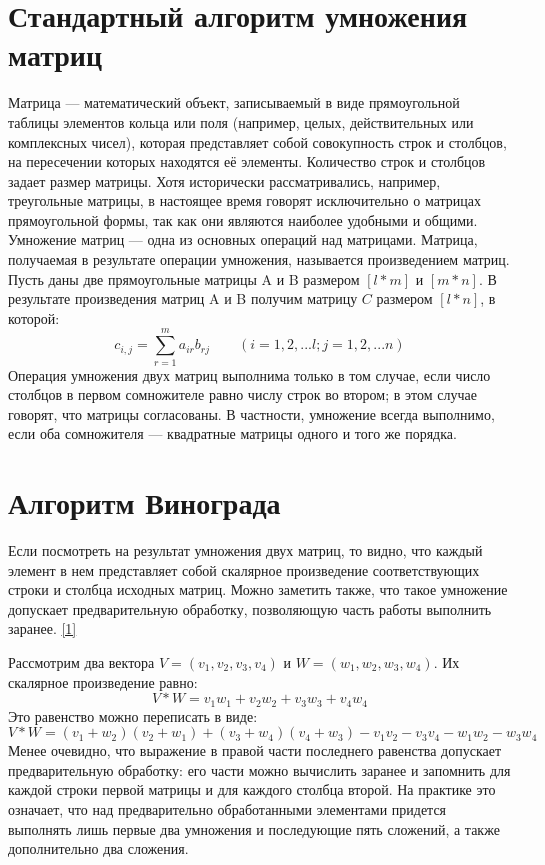 \documentclass[12pt]{report}
\begin{document}
	\section{Стандартный алгоритм умножения матриц}
	Матрица — математический объект, записываемый в виде прямоугольной таблицы элементов кольца или поля (например, целых, действительных или комплексных чисел), которая представляет собой совокупность строк и столбцов, на пересечении которых находятся её элементы. Количество строк и столбцов задает размер матрицы. Хотя исторически рассматривались, например, треугольные матрицы, в настоящее время говорят исключительно о матрицах прямоугольной формы, так как они являются наиболее удобными и общими. 
	Умножение матриц — одна из основных операций над матрицами. Матрица, получаемая в результате операции умножения, называется произведением матриц.
	Пусть даны две прямоугольные матрицы A и B размером $[l * m]$ и $[m * n]$. В результате произведения матриц A и B получим матрицу $C$ размером $[l * n]$, в которой:
	\begin{equation}
		c_{i,j} = \sum_{r=1}^{m}a_{ir}b_{rj} \qquad (i=1,2,...l; j = 1,2,...n)
	\end{equation}
	Операция умножения двух матриц выполнима только в том случае, если число столбцов в первом сомножителе равно числу строк во втором; в этом случае говорят, что матрицы согласованы. В частности, умножение всегда выполнимо, если оба сомножителя — квадратные матрицы одного и того же порядка. 
	
	\section{Алгоритм Винограда}
	Если посмотреть на результат умножения двух матриц, то видно, что каждый элемент в нем представляет собой скалярное произведение соответствующих строки и столбца исходных матриц. Можно заметить также, что такое умножение допускает предварительную обработку, позволяющую часть работы выполнить заранее. \hyperref[literature]{[1]}\par
	Рассмотрим два вектора $V = (v_{1},v_{2},v_{3},v_{4})$ и $W = (w_{1},w_{2},w_{3},w_{4})$. Их скалярное произведение равно:
	\begin{equation}
		V * W = v_{1}w_{1} + v_{2}w_{2} + v_{3}w_{3} + v_{4}w_{4}
	\end{equation}
	Это равенство можно переписать в виде:
	\begin{equation}
		V * W = (v_{1} + w_{2})(v_{2} + w_{1}) + (v_{3} + w_{4})(v_{4} + w_{3}) -  v_{1}v_{2} - v_{3}v_{4} - w_{1}w_{2} - w_{3}w_{4}
	\end{equation}
	Менее очевидно, что выражение в правой части последнего равенства допускает предварительную обработку: его части можно вычислить заранее и запомнить для каждой строки первой матрицы и для каждого столбца второй. На практике это означает, что над предварительно обработанными элементами придется выполнять лишь первые два умножения и последующие пять сложений, а также дополнительно два сложения. 
	
\end{document}
